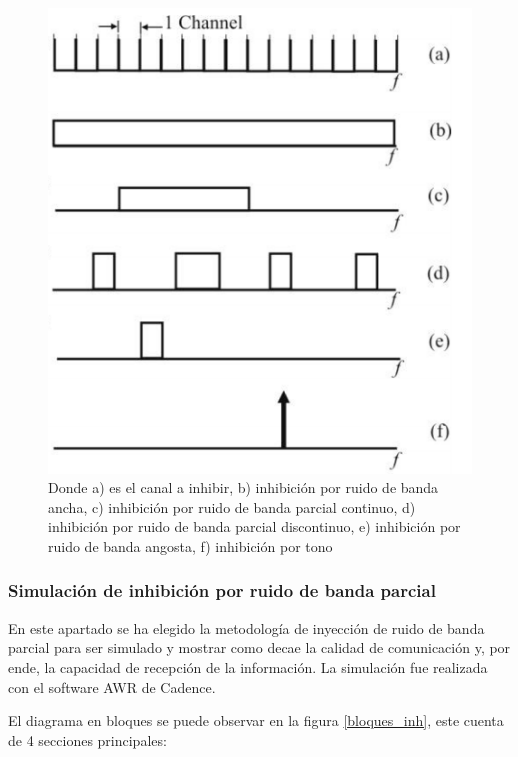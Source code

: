 \documentclass[12pt]{report}
\begin{document}
\begin{figure}[htb]
	\centering
	\includegraphics[scale=0.65]{tipos_de_jam.png}
    \caption{Donde a) es el canal a inhibir, b) inhibición por ruido de banda ancha, c) inhibición por ruido de banda parcial continuo, 
    d) inhibición por ruido de banda parcial discontinuo, e) inhibición por ruido de banda angosta, f) inhibición por tono }
	\label{tipos_de_jam}
\end{figure}

\subsubsection{Simulación de inhibición por ruido de banda parcial}

En este apartado se ha elegido la metodología de inyección de ruido de banda parcial para ser simulado y mostrar como decae la calidad de 
comunicación y, por ende, la capacidad de recepción de la información. La simulación fue realizada con el software AWR de Cadence.\par
El diagrama en bloques se puede observar en la figura \ref{bloques_inh}, este cuenta de 4 secciones principales:
\end{document}
